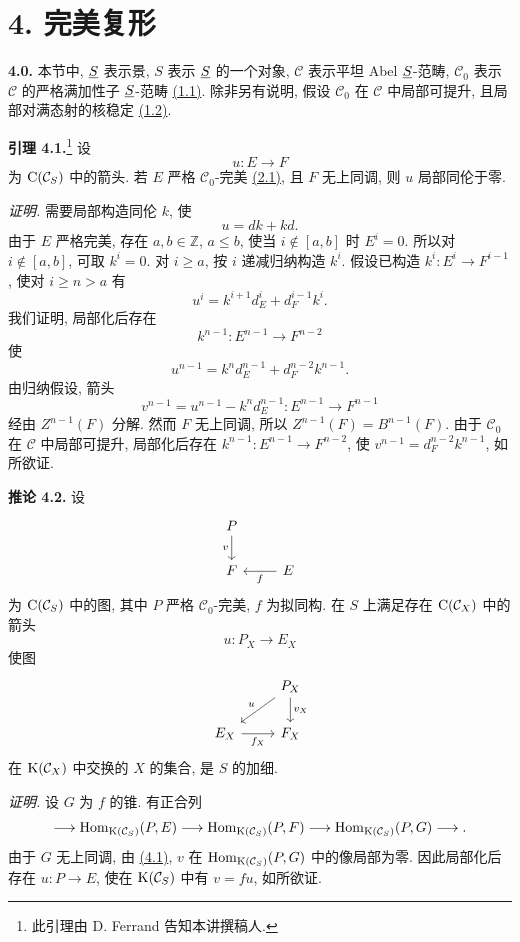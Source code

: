\section*{4. 完美复形}

\textbf{4.0.} 本节中, \(\underline S\) 表示景, \(S\) 表示 \(\underline S\) 的一个对象, \(\mathcal C\) 表示平坦 Abel \(\underline S\)-范畴, \(\mathcal C_0\) 表示 \(\mathcal C\) 的严格满加性子 \(\underline S\)-范畴 \hyperlink{sga6.e01.sec.1.1}{(1.1)}. 除非另有说明, 假设 \(\mathcal C_0\) 在 \(\mathcal C\) 中局部可提升, 且局部对满态射的核稳定 \hyperlink{sga6.e01.sec.1.2}{(1.2)}.

\textbf{引理 4.1.}\footnote{此引理由 D. Ferrand 告知本讲撰稿人.} 设
\[
  u:E\longrightarrow F
\]
为 \(\mathrm C(\mathcal C_S)\) 中的箭头. 若 \(E\) 严格 \(\mathcal C_0\)-完美 \hyperlink{sga6.e01.def.2-1}{(2.1)}, 且 \(F\) 无上同调, 则 \(u\) 局部同伦于零.

\emph{证明.} 需要局部构造同伦 \(k\), 使
\[
  u=dk+kd.
\]
由于 \(E\) 严格完美, 存在 \(a,b\in\mathbb Z\), \(a\leq b\), 使当 \(i\notin[a,b]\) 时 \(E^i=0\). 所以对 \(i\notin[a,b]\), 可取 \(k^i=0\). 对 \(i\geq a\), 按 \(i\) 递减归纳构造 \(k^i\). 假设已构造 \(k^i:E^i\to F^{i-1}\), 使对 \(i\geq n>a\) 有
\[
  u^i=k^{i+1}d_E^i+d_F^{i-1}k^i
.
\]
 我们证明, 局部化后存在
\[
  k^{n-1}:E^{n-1}\longrightarrow F^{n-2}
\]
使
\[
  u^{n-1}=k^n d_E^{n-1}+d_F^{n-2}k^{n-1}.
\]
由归纳假设, 箭头
\[
  v^{n-1}=u^{n-1}-k^n d_E^{n-1}:E^{n-1}\longrightarrow F^{n-1}
\]
经由 \(Z^{n-1}(F)\) 分解. 然而 \(F\) 无上同调, 所以 \(Z^{n-1}(F)=B^{n-1}(F)\). 由于 \(\mathcal C_0\) 在 \(\mathcal C\) 中局部可提升, 局部化后存在 \(k^{n-1}:E^{n-1}\to F^{n-2}\), 使 \(v^{n-1}=d_F^{n-2}k^{n-1}\), 如所欲证.

\textbf{推论 4.2.} 设
\[
\begin{tikzcd}
P \arrow[d,"v"'] \\
F & E \arrow[l,"f"]
\end{tikzcd}
\]
为 \(\mathrm C(\mathcal C_S)\) 中的图, 其中 \(P\) 严格 \(\mathcal C_0\)-完美, \(f\) 为拟同构. 在 \(S\) 上满足存在 \(\mathrm C(\mathcal C_X)\) 中的箭头
\[
  u:P_X\longrightarrow E_X
\]
使图
\[
\begin{tikzcd}
& P_X \arrow[d,"v_X"] \arrow[dl,"u"']\\
E_X \arrow[r,"f_X"'] & F_X
\end{tikzcd}
\]
在 \(\mathrm K(\mathcal C_X)\) 中交换的 \(X\) 的集合, 是 \(S\) 的加细.

\emph{证明.} 设 \(G\) 为 \(f\) 的锥. 有正合列
\[
  \longrightarrow \operatorname{Hom}_{\mathrm K(\mathcal C_S)}(P,E)
  \longrightarrow \operatorname{Hom}_{\mathrm K(\mathcal C_S)}(P,F)
  \longrightarrow \operatorname{Hom}_{\mathrm K(\mathcal C_S)}(P,G)
  \longrightarrow .
\]
由于 \(G\) 无上同调, 由 \hyperlink{sga6.e01.lem.4-1}{(4.1)}, \(v\) 在 \(\operatorname{Hom}_{\mathrm K(\mathcal C_S)}(P,G)\) 中的像局部为零. 因此局部化后存在 \(u:P\to E\), 使在 \(\mathrm K(\mathcal C_S)\) 中有 \(v=fu\), 如所欲证.

